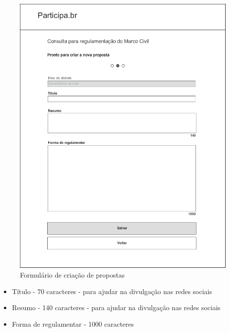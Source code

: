 \documentclass[12pt]{article}
\begin{document}
\begin{figure}[h]
\center
\includegraphics[scale=0.5]{04_-_proposta_passo_2.png}
\caption{Formulário de criação de propostas}
\label{fig:formulario-proposta}
\end{figure}

\begin{itemize}
  \item Título - 70 caracteres - para ajudar na divulgação nas redes sociais
  \item Resumo - 140 caracteres - para ajudar na divulgação nas redes sociais
  \item Forma de regulamentar - 1000 caracteres
\end{itemize}
\end{document}
